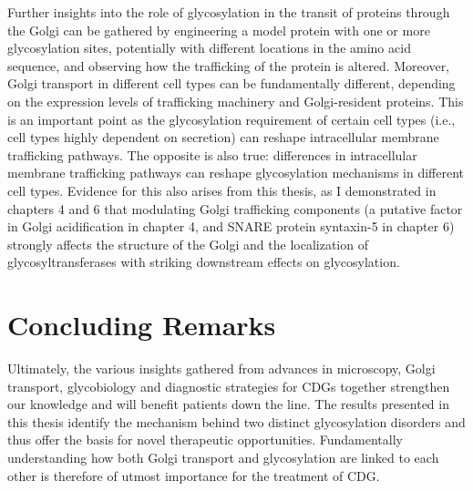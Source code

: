 Further insights into the role of glycosylation in the transit of proteins through the Golgi can be gathered by engineering a model protein with one or more glycosylation sites, potentially with different locations in the amino acid sequence, and observing how the trafficking of the protein is altered. Moreover, Golgi transport in different cell types can be fundamentally different, depending on the expression levels of trafficking machinery and Golgi-resident proteins. This is an important point as the glycosylation requirement of certain cell types (i.e., cell types highly dependent on secretion) can reshape intracellular membrane trafficking pathways. The opposite is also true: differences in intracellular membrane trafficking pathways can reshape glycosylation mechanisms in different cell types. Evidence for this also arises from this thesis, as I demonstrated in chapters 4 and 6 that modulating Golgi trafficking components (a putative factor in Golgi acidification in chapter 4, and SNARE protein syntaxin-5 in chapter 6) strongly affects the structure of the Golgi and the localization of glycosyltransferases with striking downstream effects on glycosylation. 

\section{Concluding Remarks}

Ultimately, the various insights gathered from advances in microscopy, Golgi transport, glycobiology and diagnostic strategies for CDGs together strengthen our knowledge and will benefit patients down the line. The results presented in this thesis identify the mechanism behind two distinct glycosylation disorders and thus offer the basis for novel therapeutic opportunities. Fundamentally understanding how both Golgi transport and glycosylation are linked to each other is therefore of utmost importance for the treatment of CDG.